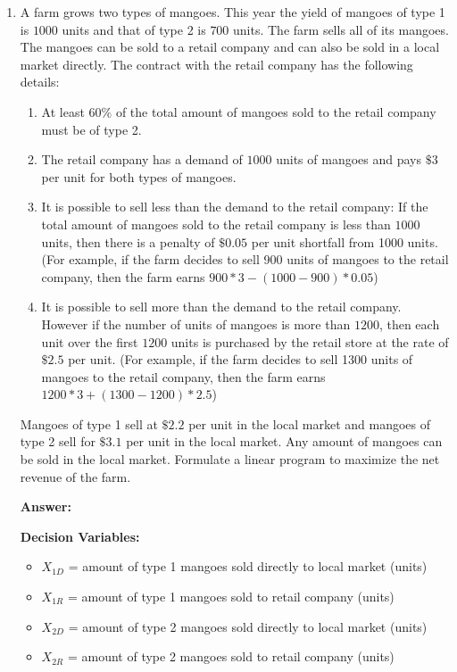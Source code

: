 \documentclass[11pt]{article}
\begin{document}
\begin{enumerate}
\item A farm grows two types of mangoes. This year the yield of mangoes of type 1 is $1000$ units and that of type 2 is $700$ units. The farm sells all of its mangoes. The mangoes can be sold to a retail company and can also be sold in a local market directly. The contract with the retail company has the following details: 
\begin{enumerate}
\item At least $60\%$ of the total amount of mangoes sold to the retail company must be of type 2.
\item The retail company has a demand of $1000$ units of mangoes and pays $\$3$ per unit for both types of mangoes.
\item It is possible to sell less than the demand to the retail company: If the total amount of mangoes sold to the retail company is less than $1000$ units, then there is a penalty of $\$0.05$ per unit shortfall from 1000 units. (For example, if the farm decides to sell 900 units of mangoes to the retail company, then the farm earns $900*3  - (1000 - 900) *0.05$) 
\item It is possible to sell more than the demand to the retail company. However if the number of units of mangoes is more than $1200$, then each unit over the first $1200$ units is purchased by the retail store at the rate of $\$2.5$ per unit. (For example, if the farm decides to sell 1300 units of mangoes to the retail company, then the farm earns $1200*3  + (1300 - 1200) *2.5$)
\end{enumerate}
Mangoes of type 1 sell at $\$2.2$ per unit in the local market and mangoes of type 2 sell for $\$3.1$ per unit in the local market. Any amount of mangoes can be sold in the local market. Formulate a linear program to maximize the net revenue of the farm.

\textbf{Answer:}

\textbf{Decision Variables:}
\begin{itemize}
\item $X_{1D}$ = amount of type 1 mangoes sold directly to local market (units)
\item $X_{1R}$ = amount of type 1 mangoes sold to retail company (units)
\item $X_{2D}$ = amount of type 2 mangoes sold directly to local market (units)
\item $X_{2R}$ = amount of type 2 mangoes sold to retail company (units)
\end{itemize}


\end{enumerate}
\end{document}
